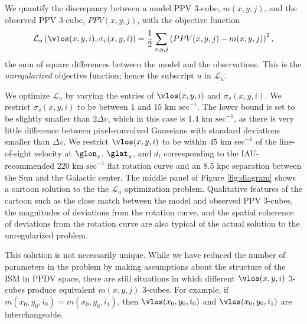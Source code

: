 We quantify the discrepancy between a model PPV 3-cube, $m(x, y, j)$, and the observed PPV 3-cube, $PPV(x, y, j)$, with the objective function
\begin{equation}
  \label{eqn:obj_unreg}
  \mathcal{L}_u \left(\vlos(x, y, i), \sigma_v(x, y, i) \right) = 
 \frac{1}{2} \sum_{x, y, j} \left(PPV(x, y, j) -  m(x, y, j)\right)^2,
\end{equation}
the sum of square differences between the model and the observations. 
This is the \emph{unregularized} objective function; hence the subscript $u$ in $\mathcal{L}_u$.

We optimize $\mathcal{L}_u$ by varying the entries of $\vlos(x, y, i)$ and $\sigma_v(x, y, i)$. 
We restrict $\sigma_v(x, y, i)$ to be between $1$ and $15\text{ km sec}^{-1}$. 
The lower bound is set to be slightly smaller than $2 \Delta v$, which in this case is $1.4 \text{ km sec}^{-1}$, as there is very little difference between pixel-convolved Gaussians with standard deviations smaller than $\Delta v$. 
We restrict $\vlos(x, y, i)$ to be within $45 \text{ km sec}^{-1}$ of the line-of-sight velocity at $\glon_x$, $\glat_y$, and $d_i$ corresponding to the IAU-recommended $220 \text{ km sec}^{-1}$ flat rotation curve and an $8.5 \text{ kpc}$ separation between the Sun and the Galactic center.
The middle panel of Figure \ref{fig:diagram} shows a cartoon solution to the the $\mathcal{L}_u$ optimization problem. 
Qualitative features of the cartoon such as the close match between the model and observed PPV 3-cubes, the magnitudes of deviations from the rotation curve, and the spatial coherence of deviations from the rotation curve are also typical of the actual solution to the unregularized problem.

This solution is not necessarily unique. 
While we have reduced the number of parameters in the problem by making assumptions about the structure of the ISM in PPDV space, there are still situations in which different $\vlos(x, y, i)$ 3-cubes produce equivalent $m(x, y, j)$ 3-cubes. 
For example, if $m(x_0, y_0, i_0) = m(x_0, y_0, i_1)$, then $\vlos(x_0, y_0, i_0)$ and $\vlos(x_0, y_0, i_1)$ are interchangeable.

